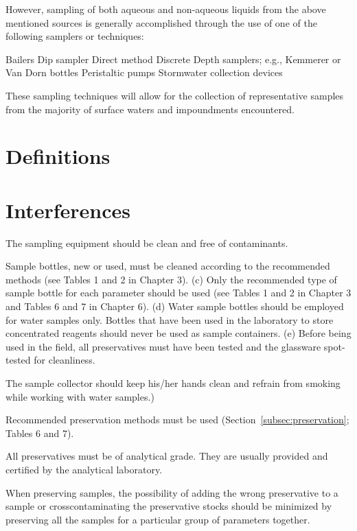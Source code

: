 \documentclass[12pt]{../SOP4_alpha}\usepackage[]{graphicx}\usepackage[]{xcolor}
\begin{document}
\NP However, sampling of both aqueous and non-aqueous liquids from the above mentioned sources is generally accomplished through the use of one of the following samplers or techniques:


\NP Bailers
\NP Dip sampler
\NP Direct method
\NP Discrete Depth samplers; e.g., Kemmerer or Van Dorn bottles
\NP Peristaltic pumps
\NP Stormwater collection devices


\NP These sampling techniques will allow for the collection of representative samples from the majority of surface waters and impoundments encountered.

\section{Definitions}



\section{Interferences}

\NP The sampling equipment should be clean and free of contaminants.



\NP Sample bottles, new or used, must be cleaned according to the recommended methods (see Tables 1 and 2 in Chapter 3). (c) Only the recommended type of sample bottle for each parameter should be used (see Tables 1 and 2 in Chapter 3 and Tables 6 and 7 in Chapter 6). (d) Water sample bottles should be employed for water samples only. Bottles that have been used in the laboratory to store concentrated reagents should never be used as sample containers. (e) Before being used in the field, all preservatives must have been tested and the glassware spot-tested for cleanliness. 

\NP The sample collector should keep his/her hands clean and refrain from smoking while working with water samples.)

\NP Recommended preservation methods must be used (Section~\ref{subsec:preservation}; Tables 6 and 7). 

\NP All preservatives must be of analytical grade. They are usually provided and certified by the analytical laboratory. 

\NP When preserving samples, the possibility of adding the wrong preservative to a sample or crosscontaminating the preservative stocks should be minimized by preserving all the samples for a particular group of parameters together. 
\end{document}
